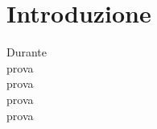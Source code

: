 \chapter*{Introduzione}

Durante 
\\[1\baselineskip]
prova
\\[2\baselineskip]
prova
\\[2\baselineskip]
prova
\\[2\baselineskip]
prova
